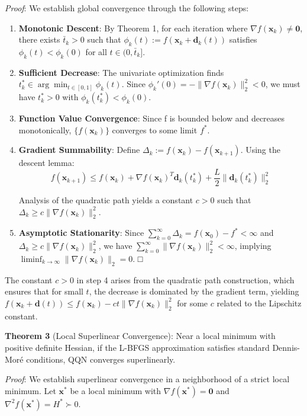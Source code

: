 \emph{Proof}: We establish global convergence through the following steps:

\begin{enumerate}
\def\labelenumi{\arabic{enumi}.}
\item
  \textbf{Monotonic Descent}: By Theorem 1, for each iteration where \(\nabla f(\mathbf{x}_k) \neq \mathbf{0}\), there exists \(\bar{t}_k > 0\) such that \(\phi_k(t) := f(\mathbf{x}_k + \mathbf{d}_k(t))\) satisfies \(\phi_k(t) < \phi_k(0)\) for all \(t \in (0, \bar{t}_k]\).
\item
  \textbf{Sufficient Decrease}: The univariate optimization finds \(t_k^* \in \arg\min_{t \in [0,1]} \phi_k(t)\).
  Since \(\phi_k'(0) = -\|\nabla f(\mathbf{x}_k)\|_2^2 < 0\), we must have \(t_k^* > 0\) with \(\phi_k(t_k^*) < \phi_k(0)\).
\item
  \textbf{Function Value Convergence}: Since f is bounded below and decreases monotonically, \(\{f(\mathbf{x}_k)\}\) converges to some limit \(f^*\).
\item
  \textbf{Gradient Summability}: Define \(\Delta_k := f(\mathbf{x}_k) - f(\mathbf{x}_{k+1})\). Using the descent lemma:
  \[f(\mathbf{x}_{k+1}) \leq f(\mathbf{x}_k) + \nabla f(\mathbf{x}_k)^T \mathbf{d}_k(t_k^*) + \frac{L}{2}\|\mathbf{d}_k(t_k^*)\|_2^2\]

  Analysis of the quadratic path yields a constant \(c > 0\) such that \(\Delta_k \geq c\|\nabla f(\mathbf{x}_k)\|_2^2\).
\item
  \textbf{Asymptotic Stationarity}: Since \(\sum_{k=0}^{\infty} \Delta_k = f(\mathbf{x}_0) - f^* < \infty\) and
  \(\Delta_k \geq c\|\nabla f(\mathbf{x}_k)\|_2^2\), we have \(\sum_{k=0}^{\infty} \|\nabla f(\mathbf{x}_k)\|_2^2 < \infty\),
  implying \(\liminf_{k \to \infty} \|\nabla f(\mathbf{x}_k)\|_2 = 0\). □
\end{enumerate}

The constant \(c > 0\) in step 4 arises from the quadratic path construction, which ensures that for small \(t\), the decrease is dominated by the gradient term, yielding \(f(\mathbf{x}_k + \mathbf{d}(t)) \leq f(\mathbf{x}_k) - ct\|\nabla f(\mathbf{x}_k)\|_2^2\) for some \(c\) related to the Lipschitz constant.

\textbf{Theorem 3} (Local Superlinear Convergence): Near a local minimum with positive definite Hessian, if the L-BFGS approximation satisfies standard Dennis-Moré conditions, QQN converges superlinearly.

\emph{Proof}: We establish superlinear convergence in a neighborhood of a strict local minimum. Let \(\mathbf{x}^*\) be a local minimum with \(\nabla f(\mathbf{x}^*) = \mathbf{0}\) and \(\nabla^2 f(\mathbf{x}^*) = H^* \succ 0\).

